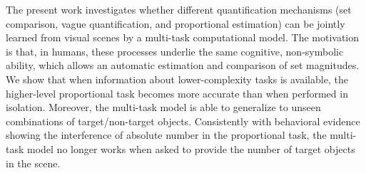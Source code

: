The present work investigates whether different quantification mechanisms (set comparison, vague quantification, and proportional estimation) can be jointly learned from visual scenes by a multi-task computational model. The motivation is that, in humans, these processes underlie the same cognitive, non-symbolic ability, which allows an automatic estimation and comparison of set magnitudes. We show that when information about lower-complexity tasks is available, the higher-level proportional task becomes more accurate than when performed in isolation. Moreover, the multi-task model is able to generalize to unseen combinations of target/non-target objects. Consistently with behavioral evidence showing the interference of absolute number in the proportional task, the multi-task model no longer works when asked to provide the number of target objects in the scene.
